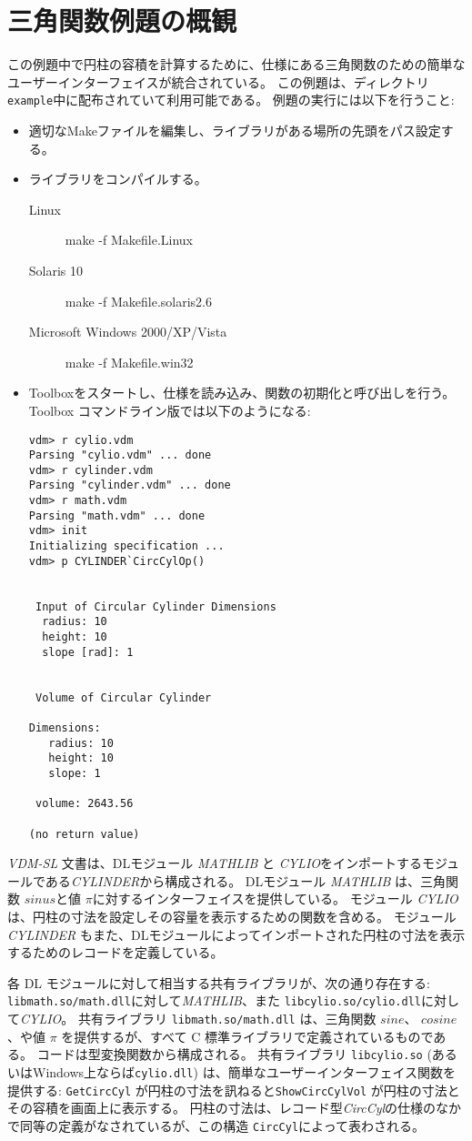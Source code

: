\documentclass[\pformat,12pt]{jarticle}
\begin{document}
\section{三角関数例題の概観}
\label{example}
この例題中で円柱の容積を計算するために、仕様にある三角関数のための簡単なユーザーインターフェイスが統合されている。
この例題は、ディレクトリ {\tt example}中に配布されていて利用可能である。
例題の実行には以下を行うこと:
\begin{itemize}
  \item 適切なMakeファイルを編集し、ライブラリがある場所の先頭をパス設定する。
  \item ライブラリをコンパイルする。
  \begin{description}
    \item[Linux] make -f Makefile.Linux
    \item[Solaris 10] make -f Makefile.solaris2.6
    \item[Microsoft Windows 2000/XP/Vista] make -f Makefile.win32
  \end{description}
  \item Toolboxをスタートし、仕様を読み込み、関数の初期化と呼び出しを行う。
 Toolbox コマンドライン版では以下のようになる:
\begin{verbatim}
vdm> r cylio.vdm
Parsing "cylio.vdm" ... done
vdm> r cylinder.vdm
Parsing "cylinder.vdm" ... done
vdm> r math.vdm
Parsing "math.vdm" ... done
vdm> init
Initializing specification ...
vdm> p CYLINDER`CircCylOp()


 Input of Circular Cylinder Dimensions
  radius: 10
  height: 10
  slope [rad]: 1


 Volume of Circular Cylinder

Dimensions: 
   radius: 10
   height: 10
   slope: 1

 volume: 2643.56

(no return value)
\end{verbatim}
\end{itemize}

{\it VDM-SL} 文書は、DLモジュール {\sl MATHLIB} と {\sl CYLIO}をインポートするモジュールである{\sl CYLINDER}から構成される。 
DLモジュール {\sl MATHLIB} は、三角関数 $sinus$と値 $\pi$に対するインターフェイスを提供している。 
モジュール {\sl CYLIO} は、円柱の寸法を設定しその容量を表示するための関数を含める。
モジュール {\sl CYLINDER} もまた、DLモジュールによってインポートされた円柱の寸法を表示するためのレコードを定義している。

各 DL モジュールに対して相当する共有ライブラリが、次の通り存在する: \\{\tt libmath.so/math.dll}に対して{\sl MATHLIB}、また {\tt libcylio.so/cylio.dll}に対して{\sl CYLIO}。 
共有ライブラリ {\tt libmath.so/math.dll} は、三角関数 $sine$、 $cosine$、や値 $\pi$ を提供するが、すべて C 標準ライブラリで定義されているものである。
コードは型変換関数から構成される。
共有ライブラリ \texttt{libcylio.so} (あるいはWindows上ならば\texttt{cylio.dll}) は、簡単なユーザーインターフェイス関数を提供する: {\tt GetCircCyl} が円柱の寸法を訊ねると{\tt ShowCircCylVol} が円柱の寸法とその容積を画面上に表示する。
円柱の寸法は、レコード型{\it CircCyl}の仕様のなかで同等の定義がなされているが、この構造 {\tt CircCyl}によって表わされる。
\end{document}
